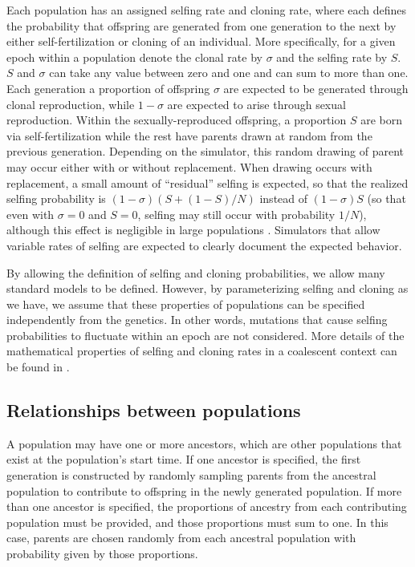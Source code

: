 \documentclass[11pt]{article}
\newcommand{\mhcomment}[1]{{\textcolor{cyan}{MH: #1}}}
\begin{document}
Each population has an assigned selfing rate and cloning rate, where each defines
the probability that offspring are generated from one generation to the next by either
self-fertilization or cloning of an individual.
More specifically, for a given epoch within a population denote the clonal rate by
$\sigma$ and the selfing rate by $S$.
$S$ and $\sigma$ can take any value between zero and one and
can sum to more than one.
Each generation a proportion of offspring
$\sigma$ are expected to be generated through clonal reproduction,
while $1-\sigma$ are expected to arise through sexual reproduction.
Within the sexually-reproduced offspring,
a proportion
$S$ are born via self-fertilization while the rest
have parents drawn at random from the previous generation.
Depending on the simulator, this random drawing of parent may occur
either with or without replacement. When drawing occurs with replacement, a small
amount of ``residual'' selfing is expected, so that the realized selfing probability
is $(1-\sigma)(S + (1-S)/N)$ instead of $(1-\sigma)S$ (so that even with $\sigma=0$
and $S=0$, selfing may still occur with probability $1/N$), although
this effect is negligible in large populations \citep{nordborg1997coalescent}.
Simulators that allow variable rates of selfing are expected to clearly
document the expected behavior.

By allowing the definition of selfing and cloning probabilities, we allow many
standard models to be defined.
However, by parameterizing selfing and cloning as we have, we assume that these
properties of populations can be specified independently from the genetics.
In other words, mutations that cause selfing probabilities to fluctuate within
an epoch are not considered.
More details of the mathematical properties of selfing and cloning rates
in a coalescent context can be found in
\citet{nordborg1997coalescent,hartfield2016facsexcoal}.


\subsection{Relationships between populations}

A population may have one
or more ancestors, which are other populations that exist at the population's
start time. If one ancestor is specified, the first generation is constructed
by randomly sampling parents from the ancestral population to contribute to
offspring in the newly generated population. If more than one ancestor is
specified, the proportions of ancestry from each contributing population must
be provided, and those proportions must sum to one. In this case, parents are
chosen randomly from each ancestral population with probability given by those
proportions.
\end{document}
